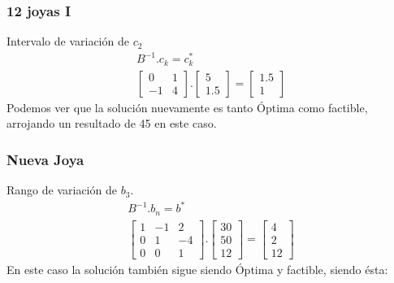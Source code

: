 \begin{homeworkProblem}
\subsubsection{12 joyas \RN{1}}
Intervalo de variación de $c_2$
\begin{align*}
B^{-1}.c_k=c_k^{*}\\
    \begin{bmatrix}
        0 & 1 \\
        -1 & 4
    \end{bmatrix}.
    \begin{bmatrix}
        5 \\
        1.5        
    \end{bmatrix}=
    \begin{bmatrix}
        1.5 \\
        1
    \end{bmatrix}
\end{align*}
Podemos ver que la solución nuevamente es tanto Óptima como factible, arrojando un resultado de 45 en este caso.

\subsubsection{Nueva Joya}
Rango de variación de $b_3$.
\begin{align*}
    B^{-1}.b_n = b^{*} \\
    \begin{bmatrix}
        1 & -1 & 2 \\
        0 & 1 & -4 \\
        0 & 0 & 1 
    \end{bmatrix}.
    \begin{bmatrix}
        30 \\
        50 \\
        12
    \end{bmatrix}=
    \begin{bmatrix}
        4 \\
        2\\
        12
    \end{bmatrix}
\end{align*}
En este caso la solución también sigue siendo Óptima y factible, siendo ésta:
\end{homeworkProblem}

